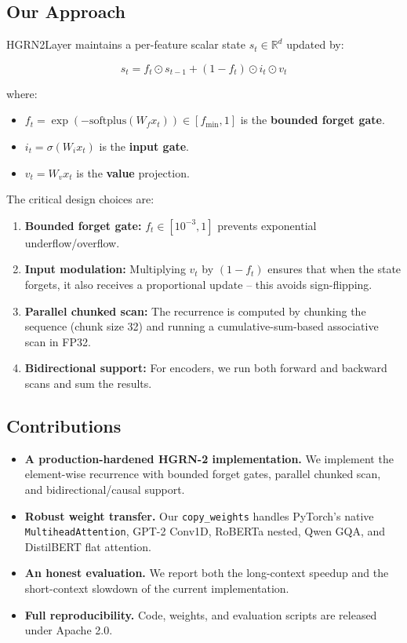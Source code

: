 \subsection{Our Approach}

HGRN2Layer maintains a per-feature scalar state $s_t \in \mathbb{R}^d$ 
updated by:

\[
s_t = f_t \odot s_{t-1} + (1 - f_t) \odot i_t \odot v_t
\tag{1.1}
\]

where:

\begin{itemize}
\item $f_t = \exp(-\text{softplus}(W_f x_t)) \in [f_\text{min}, 1]$ is the
  \textbf{bounded forget gate}.
\item $i_t = \sigma(W_i x_t)$ is the \textbf{input gate}.
\item $v_t = W_v x_t$ is the \textbf{value} projection.

\end{itemize}
The critical design choices are:

\begin{enumerate}
\item \textbf{Bounded forget gate:} $f_t \in [10^{-3}, 1]$ prevents exponential
  underflow/overflow.
\item \textbf{Input modulation:} Multiplying $v_t$ by $(1 - f_t)$ ensures that when
  the state forgets, it also receives a proportional update -- this avoids
  sign-flipping.
\item \textbf{Parallel chunked scan:} The recurrence is computed by chunking the
  sequence (chunk size 32) and running a cumulative-sum-based associative
  scan in FP32.
\item \textbf{Bidirectional support:} For encoders, we run both forward and backward
  scans and sum the results.

\end{enumerate}
\subsection{Contributions}

\begin{itemize}
\item \textbf{A production-hardened HGRN-2 implementation.} We implement the
  element-wise recurrence with bounded forget gates, parallel chunked scan,
  and bidirectional/causal support.
\item \textbf{Robust weight transfer.} Our \texttt{copy\_weights} handles PyTorch's native
  \texttt{MultiheadAttention}, GPT-2 Conv1D, RoBERTa nested, Qwen GQA, and
  DistilBERT flat attention.
\item \textbf{An honest evaluation.} We report both the long-context speedup and the
  short-context slowdown of the current implementation.
\item \textbf{Full reproducibility.} Code, weights, and evaluation scripts are
  released under Apache 2.0.

\end{itemize}
